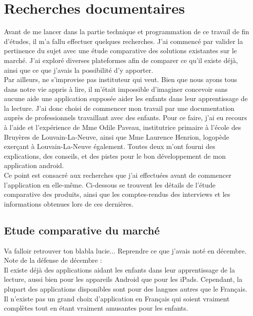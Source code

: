\section{Recherches documentaires}
Avant de me lancer dans la partie technique et programmation de ce travail de fin d'études, il m'a fallu effectuer quelques recherches. J'ai commencé par valider la pertinence du sujet avec une étude comparative des solutions existantes sur le marché. J'ai exploré diverses plateformes afin de comparer ce qu'il existe déjà, ainsi que ce que j'avais la possibilité d'y apporter. \\

Par ailleurs, ne s'improvise pas instituteur qui veut. Bien que nous ayons tous dans notre vie appris à lire, il m'était impossible d'imaginer concevoir sans aucune aide une application supposée aider les enfants dans leur apprentissage de la lecture. J'ai donc choisi de commencer mon travail par une documentation auprès de professionnels travaillant avec des enfants. Pour ce faire, j'ai eu recours à l'aide et l'expérience de Mme Odile Paveau, institutrice primaire à l'école des Bruyères de Louvain-La-Neuve, ainsi que Mme Laurence Henrion, logopède exerçant à Louvain-La-Neuve également. Toutes deux m'ont fourni des explications, des conseils, et des pistes pour le bon développement de mon application android.\\

Ce point est consacré aux recherches que j'ai effectuées avant de commencer l'application en elle-même. Ci-dessous se trouvent les détails de l'étude comparative des produits, ainsi que les comptes-rendus des interviews et les informations obtenues lors de ces dernières.

\subsection{Etude comparative du marché}
Va falloir retrouver ton blabla lucie... Reprendre ce que j'avais noté en décembre. Note de la défense de décembre :\\

Il existe déjà des applications aidant les enfants dans leur apprentissage de la lecture, aussi bien pour les appareils Android que pour les iPads. Cependant, la plupart des applications disponibles sont pour des langues autres que le Français. Il n'existe pas un grand choix d'application en Français qui soient vraiment complètes tout en étant vraiment amusantes pour les enfants.\\

